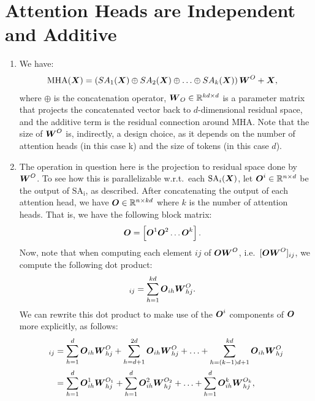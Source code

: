 \documentclass[11pt,a4paper]{article}
\newcommand\op[1]{\operatorname{#1}}
\begin{document}
\section{Attention Heads are Independent and Additive}

\begin{enumerate}[label=(\alph*)]
    \item We have:
          \begin{align}
              \op{MHA}(\mX) & = \left(SA_1(\mX) \oplus SA_2(\mX) \oplus \ldots \oplus SA_k(\mX)\right)\mW^O + \mX,
          \end{align}
          where $\oplus$ is the concatenation operator,
          ${\boldsymbol{W}}_O\in\mathbb{R}^{kd\times d}$ is a parameter matrix that projects the
          concatenated vector back to $d$-dimensional residual space, and the
          additive term is the residual connection around MHA.
          Note that the size of ${\boldsymbol{W}}^O$ is, indirectly, a design choice, as it
          depends on the number of attention heads (in this case k) and the size
          of tokens (in this case $d$).
    \item The operation in question here is the projection to residual space
          done by ${\boldsymbol{W}}^O$.
          To see how this is parallelizable w.r.t.\ each
          $\op{SA}_i(\mX)$, let ${\boldsymbol{O}}^i\in\mathbb{R}^{n\times d}$ be the output of
          $\op{SA_i}$, as described. After concatenating the output of each
          attention head, we have ${\boldsymbol{O}}\in\mathbb{R}^{n\times kd}$ where $k$ is the
          number of attention heads. That is, we have the following block
          matrix:
          \begin{align}
              {\boldsymbol{O}} & = \left[{\boldsymbol{O}}^1 {\boldsymbol{O}}^2 \ldots {\boldsymbol{O}}^k\right].
          \end{align}
          Now, note that when computing each element $ij$ of ${\boldsymbol{O}}{\boldsymbol{W}}^O$,
          i.e.\ $[{\boldsymbol{O}}{\boldsymbol{W}}^O]_{ij}$, we compute the following dot product:
          \begin{align}
              [\mO\mW^O]_{ij} & = \sum_{h=1}^{kd} \mO_{ih}\mW^O_{hj}.
          \end{align}
          We can rewrite this dot product to make use of the ${\boldsymbol{O}}^i$ components
          of ${\boldsymbol{O}}$ more explicitly, as follows:
          \begin{align}
              [\mO\mW^O]_{ij} & = \sum_{h=1}^{d} \mO_{ih}\mW^O_{hj} + \sum_{h=d+1}^{2d} \mO_{ih}\mW^O_{hj} + \ldots + \sum_{h=(k-1)d+1}^{kd} \mO_{ih}\mW^O_{hj}         \\
                              & = \sum_{h=1}^{d} \mO^1_{ih}\mW^{O_1}_{hj} + \sum_{h=1}^{d} \mO^2_{ih}\mW^{O_2}_{hj} + \ldots + \sum_{h=1}^{d} \mO^k_{ih}\mW^{O_k}_{hj},

\end{align}
\end{enumerate}
\end{document}
